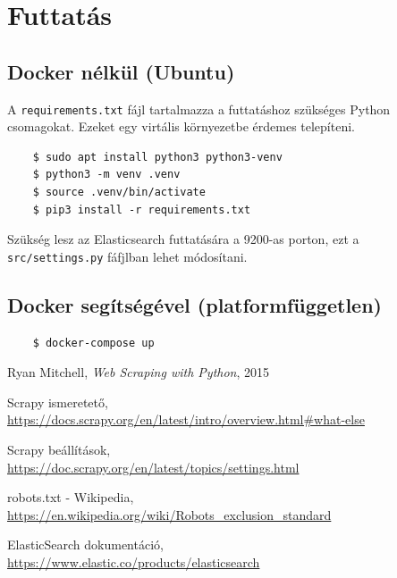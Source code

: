 \documentclass[10pt]{article}
\begin{document}
\section{Futtatás}
\subsection{Docker nélkül (Ubuntu)}
A \lstinline{requirements.txt} fájl tartalmazza a futtatáshoz szükséges Python csomagokat. Ezeket egy virtális környezetbe érdemes telepíteni. 
\begin{lstlisting}  
    $ sudo apt install python3 python3-venv
    $ python3 -m venv .venv
    $ source .venv/bin/activate
    $ pip3 install -r requirements.txt
\end{lstlisting}
Szükség lesz az Elasticsearch futtatására a 9200-as porton, ezt a \lstinline{src/settings.py} fáfjlban lehet módosítani.

\subsection{Docker segítségével (platformfüggetlen)}
\begin{lstlisting}
    $ docker-compose up
\end{lstlisting}

\begin{thebibliography}{9}
    Ryan Mitchell, \textit{Web Scraping with Python}, 2015

    Scrapy ismeretető, \\
    \url{https://docs.scrapy.org/en/latest/intro/overview.html#what-else}
    
    Scrapy beállítások, \\
    \url{https://doc.scrapy.org/en/latest/topics/settings.html}

    robots.txt - Wikipedia, \\
    \url{https://en.wikipedia.org/wiki/Robots_exclusion_standard}
    
   ElasticSearch dokumentáció, \\
   \url{https://www.elastic.co/products/elasticsearch} 
\end{thebibliography}
\end{document}
